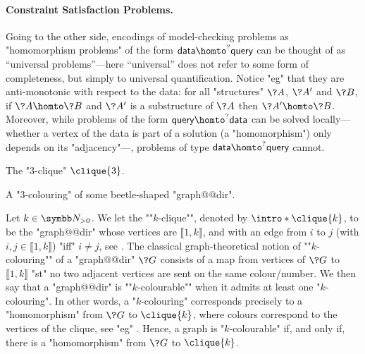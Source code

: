 \paragraph*{Constraint Satisfaction Problems.}
Going to the other side, encodings of model-checking problems
as "homomorphism problems" of the form $\textsf{data} \homto^? \textsf{query}$
can be thought of as ``universal problems''---here ``universal'' does not
refer to some form of completeness, but simply to universal quantification.
Notice "eg" that they are anti-monotonic with respect to the data:
for all "structures" $\?A$, $\?A'$ and $\?B$, if $\?A \homto \?B$ and $\?A'$ is a substructure
of $\?A$ then $\?A' \homto \?B$.
Moreover, while problems of the form $\textsf{query} \homto^? \textsf{data}$
can be solved locally---whether a vertex of the data is part of a solution (a "homomorphism") only 
depends on its "adjacency"---, problems of type $\textsf{data} \homto^? \textsf{query}$ cannot.

\begin{marginfigure}[-18em]
	\centering
	\begin{tikzpicture}
		
	\end{tikzpicture}
	\caption{
		\AP\label{fig:intro-3-clique}
		The "$3$-clique" $\clique{3}$.
	}
\end{marginfigure}
\begin{marginfigure}[-6em]
	\centering
	\begin{tikzpicture}
		
	\end{tikzpicture}
	\caption{
		\AP\label{fig:dichotomy-ex-3-clique}
		A "$3$-colouring" of some beetle-shaped "graph@@dir".
	}
\end{marginfigure}
\begin{example}
	\AP\label{ex:graph-colouring-as-hom}
	Let $k\in\Np$. We let the \AP""$k$-clique"", denoted by $\intro*\clique{k}$,
	to be the "graph@@dir" whose vertices are $\lBrack 1,k\rBrack$,
	and with an edge from $i$ to $j$ (with $i,j \in \lBrack 1,k\rBrack$)
	"iff" $i\neq j$, see .
	The classical graph-theoretical notion of \AP""$k$-colouring""
	of a "graph@@dir" $\?G$ consists of
	a map from vertices of $\?G$ to $\lBrack 1,k\rBrack$
	"st" no two adjacent vertices are sent on the same colour/number.
	We then say that a "graph@@dir" is \AP""$k$-colourable"" when
	it admits at least one "$k$-colouring".
	In other words, a "$k$-colouring" corresponds precisely to a "homomorphism" from $\?G$
	to $\clique{k}$, where colours correspond to the vertices of the clique,
	see "eg" .
	Hence, a graph is "$k$-colourable" if, and only if,
	there is a "homomorphism" from $\?G$ to $\clique{k}$.
\end{example}

